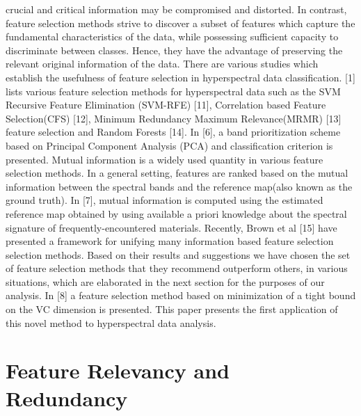 \documentclass[document.tex]{subfiles}
\begin{document}
crucial and critical information may be compromised and distorted. In contrast, feature
selection methods strive to discover a subset of features which capture the fundamental
characteristics of the data, while possessing sufficient capacity to discriminate between
classes. Hence, they have the advantage of preserving the relevant original information of
the data. There are various studies which establish the usefulness of feature selection in
hyperspectral data classification. [1] lists various feature selection methods for hyperspectral data such as the SVM Recursive Feature Elimination (SVM-RFE) [11], Correlation
based Feature Selection(CFS) [12], Minimum Redundancy Maximum Relevance(MRMR)
[13] feature selection and Random Forests [14]. In [6], a band prioritization scheme based
on Principal Component Analysis (PCA) and classification criterion is presented. Mutual
information is a widely used quantity in various feature selection methods. In a general
setting, features are ranked based on the mutual information between the spectral bands
and the reference map(also known as the ground truth). In [7], mutual information is
computed using the estimated reference map obtained by using available a priori knowledge about the spectral signature of frequently-encountered materials. Recently, Brown et al [15] have presented a framework for unifying many information based feature selection selection methods. Based on their results and suggestions we have chosen the set of
feature selection methods that they recommend outperform others, in various situations,
which are elaborated in the next section for the purposes of our analysis. In [8] a feature
selection method based on minimization of a tight bound on the VC dimension is presented. This paper presents the first application of this novel method to hyperspectral
data analysis.

\section{Feature Relevancy and Redundancy}
\end{document}
